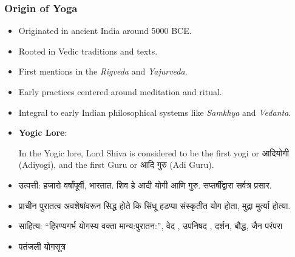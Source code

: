\begin{frame}[fragile]\frametitle{Origin of Yoga}

      \begin{itemize}
		\item Originated in ancient India around 5000 BCE.
		\item Rooted in Vedic traditions and texts.
		\item First mentions in the \textit{Rigveda} and \textit{Yajurveda}.
		\item Early practices centered around meditation and ritual.
		\item Integral to early Indian philosophical systems like \textit{Samkhya} and \textit{Vedanta}.
          
          
          
          
        \item \textbf{Yogic Lore}: 
          
          In the Yogic lore, Lord Shiva is considered to be the first yogi or आदियोगी (Adiyogi), and the first Guru or आदि गुरु (Adi Guru).
          		
		\item  उत्पत्ती: हजारो वर्षांपूर्वी, भारतात. शिव हे आदी योगी आणि गुरु. सप्तर्षींद्वारा सर्वत्र प्रसार. 
		\item प्राचीन पुरातत्व अवशेषांवरून सिद्ध होते कि सिंधू हडप्पा संस्कृतीत योग होता, मुद्रा मुर्त्या होत्या. 
		\item साहित्य: “हिरण्यगर्भ योगस्य वक्ता मान्य:पुरातन:”, वेद , उपनिषद , दर्शन, बौद्ध, जैन परंपरा 
		\item पतंजली योगसूत्र 				
	  \end{itemize}

\end{frame}

